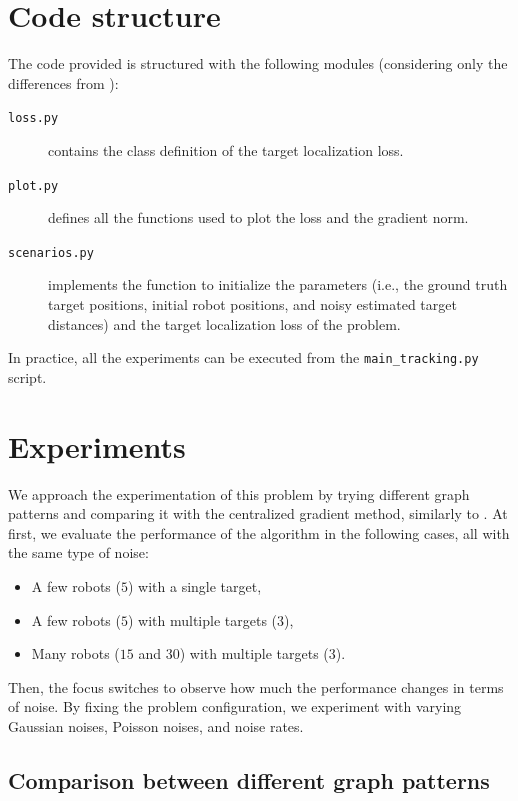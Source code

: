 \documentclass[a4paper,11pt,oneside]{book}
\begin{document}
\section{Code structure}
The code provided is structured with the following modules (considering only the differences from ):
\begin{description}
      \item[\texttt{loss.py}] contains the class definition of the target localization loss.
      \item[\texttt{plot.py}] defines all the functions used to plot the loss and the gradient norm.
      \item[\texttt{scenarios.py}] implements the function to initialize the parameters (i.e., the ground truth target positions, initial robot positions, and noisy estimated target distances) and the target localization loss of the problem.
\end{description}
In practice, all the experiments can be executed from the \texttt{main\_tracking.py} script.



\section{Experiments}

We approach the experimentation of this problem by trying different graph patterns and comparing it with the centralized gradient method, similarly to . At first, we evaluate the performance of the algorithm in the following cases, all with the same type of noise:
\begin{itemize}
      \item A few robots ($5$) with a single target,
      \item A few robots ($5$) with multiple targets ($3$),
      \item Many robots ($15$ and $30$) with multiple targets ($3$).
\end{itemize}

Then, the focus switches to observe how much the performance changes in terms of noise. By fixing the problem configuration, we experiment with varying Gaussian noises, Poisson noises, and noise rates.


\subsection{Comparison between different graph patterns}
\end{document}
